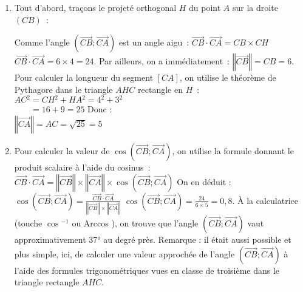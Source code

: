 \begin{corrige}
     \begin{enumerate}
          \item
          Tout d'abord, traçons le projeté orthogonal $H$ du point  $A$ sur la droite $(CB) $~:

\begin{center}
\end{center}

          Comme l'angle $\left( \overrightarrow{CB} ; \overrightarrow{CA}  \right) $ est un angle aigu~:
          \newpar
          $\overrightarrow{CB}  \cdot \overrightarrow{CA} =CB \times CH$\\
          $\overrightarrow{CB}  \cdot \overrightarrow{CA} =6 \times 4=24.$
          \medbreak
          Par ailleurs, on a immédiatement~:
          \newpar
          $\left\Vert \overrightarrow{CB} \right\Vert =CB=6.$
          \medbreak
          Pour calculer la longueur du segment $[CA] $, on utilise le théorème de Pythagore dans le triangle $AHC$ rectangle en $H$~:
          \newpar
          $AC{}^2 =CH{}^2 +HA{}^2 =4{}^2 +3{}^2 $\\
          $\phantom{AC{}^2 }=16+9=25$
          \newpar
          Donc :\\
          $ \left\Vert \overrightarrow{CA} \right\Vert =AC=\sqrt{25} = 5$
          \item
          Pour calculer la valeur de  $ \cos\left( \overrightarrow{CB} ;\overrightarrow{CA}  \right) $, on utilise la formule donnant le produit scalaire à l'aide du cosinus~:
          \newpar
          $\overrightarrow{CB}  \cdot \overrightarrow{CA} = \left\Vert \overrightarrow{CB} \right\Vert  \times \left\Vert \overrightarrow{CA} \right\Vert  \times \cos\left( \overrightarrow{CB} ;\overrightarrow{CA}  \right)$
          \newpar
          On en déduit :
          \newpar
          $\cos\left( \overrightarrow{CB} ;\overrightarrow{CA}  \right) = \frac{\overrightarrow{CB}  \cdot \overrightarrow{CA} }{ \left\Vert \overrightarrow{CB} \right\Vert  \times \left\Vert \overrightarrow{CA} \right\Vert } $
          \newpar
          $\cos\left( \overrightarrow{CB} ;\overrightarrow{CA}  \right) =\frac{24}{6 \times 5} =0,8.$
          \medbreak
          À la calculatrice (touche \og $\cos{}^{ - 1}$  \fg{}  ou \og Arccos \fg{} ), on trouve que l'angle $\left( \overrightarrow{CB} ;\overrightarrow{CA}  \right)$ vaut approximativement 37° au degré près.
          \medbreak
          Remarque : il était aussi possible et plus simple, ici, de calculer une valeur approchée de l'angle $\left( \overrightarrow{CB} ;\overrightarrow{CA}  \right)$ à l'aide des formules trigonométriques vues en classe de troisième dans le triangle rectangle $AHC$.
     \end{enumerate}
\end{corrige}
